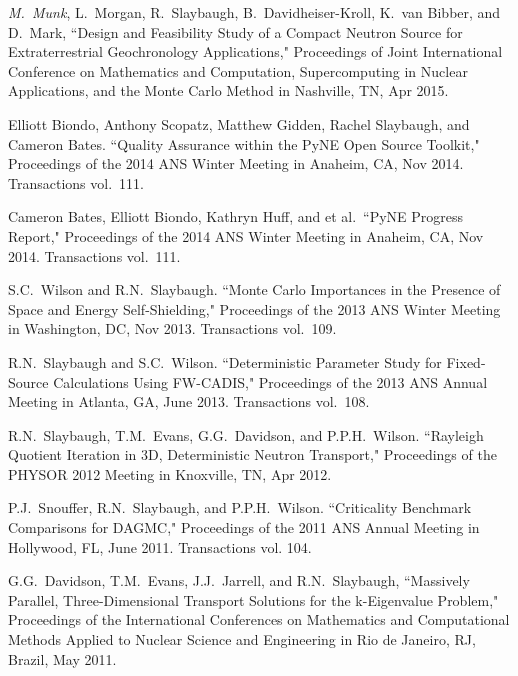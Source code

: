 \begin{bibsection}
\item  \textit{M.\ Munk}, L.\ Morgan, R.\ Slaybaugh, B.\ Davidheiser-Kroll, K.\ van Bibber, and D.\ Mark, ``Design and Feasibility Study of a Compact Neutron Source for Extraterrestrial Geochronology Applications," Proceedings of Joint International Conference on Mathematics and Computation, Supercomputing in Nuclear Applications, and the Monte Carlo Method in Nashville, TN, Apr 2015.

\item Elliott Biondo, Anthony Scopatz, Matthew Gidden, Rachel Slaybaugh, and Cameron Bates. ``Quality Assurance within the PyNE Open Source Toolkit,"  Proceedings of the 2014 ANS Winter Meeting in Anaheim, CA, Nov 2014. Transactions vol.\ 111.

\item Cameron Bates, Elliott Biondo, Kathryn Huff, and et al.\ ``PyNE Progress Report," Proceedings of the 2014 ANS Winter Meeting in Anaheim, CA, Nov 2014. Transactions vol.\ 111.

\item S.C.\ Wilson and R.N.\ Slaybaugh. ``Monte Carlo Importances in the Presence of Space and Energy Self-Shielding," Proceedings of the 2013 ANS Winter Meeting in Washington, DC, Nov 2013. Transactions vol.\ 109.

\item R.N.\ Slaybaugh and  S.C.\ Wilson. ``Deterministic Parameter Study for Fixed-Source Calculations Using FW-CADIS," Proceedings of the 2013 ANS Annual Meeting in Atlanta, GA, June 2013. Transactions vol.\ 108.

\item R.N.\ Slaybaugh, T.M.\ Evans, G.G.\ Davidson, and P.P.H.\ Wilson. ``Rayleigh Quotient Iteration in 3D, Deterministic Neutron Transport," Proceedings of the PHYSOR 2012 Meeting in Knoxville, TN, Apr 2012.

\item P.J.\ Snouffer, R.N.\ Slaybaugh, and P.P.H.\ Wilson. ``Criticality Benchmark Comparisons for DAGMC," Proceedings of the 2011 ANS Annual Meeting in Hollywood, FL, June 2011. Transactions vol. 104.

\item G.G.\ Davidson, T.M.\ Evans, J.J.\ Jarrell, and R.N.\ Slaybaugh, ``Massively Parallel, Three-Dimensional Transport Solutions for the k-Eigenvalue Problem," Proceedings of the International Conferences on Mathematics and Computational Methods Applied to Nuclear Science and Engineering in Rio de Janeiro, RJ, Brazil, May 2011.


\end{bibsection}
